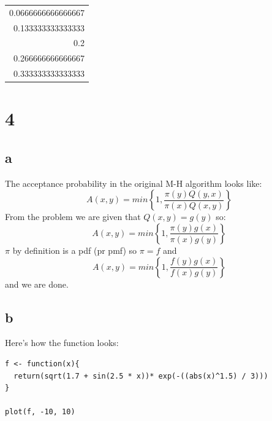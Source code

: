 \documentclass[11pt]{article}
\begin{document}
\begin{center}
\begin{tabular}{r}
0.0666666666666667\\
0.133333333333333\\
0.2\\
0.266666666666667\\
0.333333333333333\\
\end{tabular}
\end{center}

\section*{4}
\label{sec:org7d3ef8a}
\subsection*{a}
\label{sec:org9da819e}

The acceptance probability in the original M-H algorithm looks like:\\
$$A(x,y) = min\left\{ 1, \frac{\pi(y)Q(y, x)}{\pi(x)Q(x,y)}\right\}$$
From the problem we are given that $ Q(x, y) = g(y)$ so:\\
$$A(x,y) = min\left\{ 1, \frac{\pi(y)g(x)}{\pi(x)g(y)}\right\}$$
$\pi$ by definition is a pdf (pr pmf) so $\pi = f$ and\\
$$A(x,y) = min\left\{ 1, \frac{f(y)g(x)}{f(x)g(y)}\right\}$$
and we are done.

\subsection*{b}
\label{sec:orgb83fd77}

Here's how the function looks:
\begin{verbatim}
f <- function(x){
  return(sqrt(1.7 + sin(2.5 * x))* exp(-((abs(x)^1.5) / 3)))
}

plot(f, -10, 10)
\end{verbatim}
\end{document}
